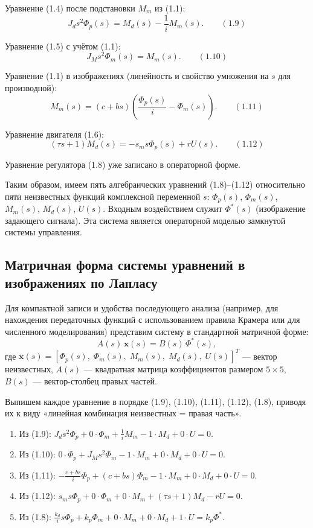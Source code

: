 \documentclass[a4paper, 14pt]{extarticle}
\begin{document}
    Уравнение (1.4) после подстановки $M_m$ из (1.1):
    \[
    J_d s^2 \Phi_p(s) = M_d(s) - \frac{1}{i} M_m(s). \qquad (1.9)
    \]

    Уравнение (1.5) с учётом (1.1):
    \[
    J_M s^2 \Phi_m(s) = M_m(s). \qquad (1.10)
    \]

    Уравнение (1.1) в изображениях (линейность и свойство умножения на $s$ для производной):
    \[
    M_m(s) = (c + b s)\left(\frac{\Phi_p(s)}{i} - \Phi_m(s)\right). \qquad (1.11)
    \]

    Уравнение двигателя (1.6):
    \[
    (\tau s + 1) M_d(s) = -s_m s \Phi_p(s) + r U(s). \qquad (1.12)
    \]

    Уравнение регулятора (1.8) уже записано в операторной форме.

    Таким образом, имеем пять алгебраических уравнений (1.8)–(1.12) относительно пяти неизвестных функций комплексной переменной $s$: $\Phi_p(s)$, $\Phi_m(s)$, $M_m(s)$, $M_d(s)$, $U(s)$. Входным воздействием служит $\Phi^*(s)$ (изображение задающего сигнала). Эта система является операторной моделью замкнутой системы управления.

    \subsection{Матричная форма системы уравнений в изображениях по Лапласу}
    Для компактной записи и удобства последующего анализа (например, для нахождения передаточных функций с использованием правила Крамера или для численного моделирования) представим систему в стандартной матричной форме:
    \[
    A(s) \, \mathbf{x}(s) = B(s) \, \Phi^*(s),
    \]
    где $\mathbf{x}(s) = [\Phi_p(s),\; \Phi_m(s),\; M_m(s),\; M_d(s),\; U(s)]^T$ — вектор неизвестных, $A(s)$ — квадратная матрица коэффициентов размером $5 \times 5$, $B(s)$ — вектор-столбец правых частей.

    Выпишем каждое уравнение в порядке (1.9), (1.10), (1.11), (1.12), (1.8), приводя их к виду «линейная комбинация неизвестных = правая часть».

    \begin{enumerate}
    \item Из (1.9): $J_d s^2 \Phi_p + 0\cdot\Phi_m + \frac{1}{i} M_m - 1\cdot M_d + 0\cdot U = 0$.
    \item Из (1.10): $0\cdot\Phi_p + J_M s^2 \Phi_m - 1\cdot M_m + 0\cdot M_d + 0\cdot U = 0$.
    \item Из (1.11): $-\frac{c+bs}{i} \Phi_p + (c+bs) \Phi_m - 1\cdot M_m + 0\cdot M_d + 0\cdot U = 0$.
    \item Из (1.12): $s_m s \Phi_p + 0\cdot\Phi_m + 0\cdot M_m + (\tau s+1) M_d - r U = 0$.
    \item Из (1.8): $\frac{k_d}{i}s \Phi_p + k_p \Phi_m + 0\cdot M_m + 0\cdot M_d + 1\cdot U = k_p \Phi^*$.
    \end{enumerate}
\end{document}
